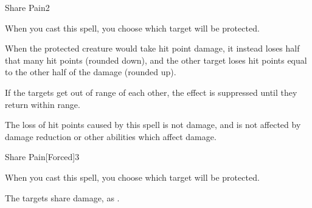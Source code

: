 \begin{spellsection}{Share Pain}{2}
\begin{spellheader}
    \begin{spelltargetinginfo}
    \end{spelltargetinginfo}
    \begin{spelleffects}
        \spellspecial When you cast this spell, you choose which target will be protected.
    \end{spelleffects}
\end{spellheader}
\begin{spellcontent}
    \spelleffect When the protected creature would take hit point damage, it instead loses half that many hit points (rounded down), and the other target loses hit points equal to the other half of the damage (rounded up).

    If the targets get out of range of each other, the effect is suppressed until they return within range.
    \spelldur \durlong \dismissable
\end{spellcontent}
\begin{spellfooter}
    \spellnotes The loss of hit points caused by this spell is not damage, and is not affected by damage reduction or other abilities which affect damage.
\end{spellfooter}
\end{spellsection}

\begin{spellsection}{Share Pain}[Forced]{3}
\begin{spellheader}
    \begin{spelltargetinginfo}
    \end{spelltargetinginfo}
    \begin{spelleffects}
        \spellspecial When you cast this spell, you choose which target will be protected.
    \end{spelleffects}
\end{spellheader}
\begin{spellcontent}
    \begin{spellmargin}
        \spellsuccess The targets share damage, as .
    \end{spellmargin}
    \spelldur \durlong \dismissable
\end{spellcontent}
\begin{spellfooter}
\end{spellfooter}
\end{spellsection}

